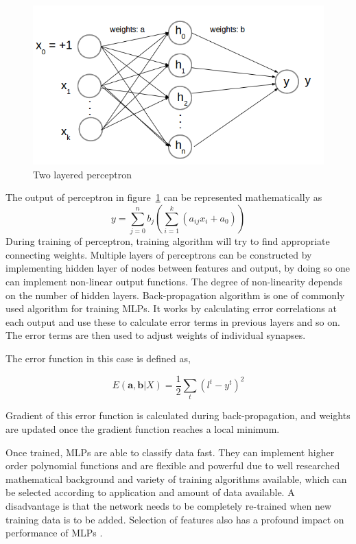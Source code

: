\begin{figure}[h]
  \begin{center}
    \captionsetup{justification=centering}
    \includegraphics[scale=0.45]{figures/perceptron.png}
    \caption{Two layered perceptron}
    \label{fig:perceptron}
  \end{center}
\end{figure}

The output of perceptron in figure~\ref{fig:perceptron} can be represented mathematically as
\[ y = \sum\limits_{j=0}^n b_j (\sum\limits_{i=1}^k (a_{ij}x_i + a_0))\]
During training of perceptron, training algorithm will try to find appropriate connecting weights. Multiple layers of perceptrons can be constructed by implementing hidden layer of nodes between features and output, by doing so one can implement non-linear output functions. The degree of non-linearity depends on the number of hidden layers. Back-propagation algorithm \cite{Rumelhart1985} is one of commonly used algorithm for training MLPs. It works by calculating error correlations at each output and use these to calculate error terms in previous layers and so on. The error terms are then used to adjust weights of individual synapses. 

The error function in this case is defined as,

\[ E(\boldsymbol{a},\boldsymbol{b}|X) = \frac{1}{2} \sum\limits_{t} (l^t - y^t)^2\]

Gradient of this error function is calculated during back-propagation, and weights are updated once the gradient function reaches a local minimum.

Once trained, MLPs are able to classify data fast. They can implement higher order polynomial functions and are flexible and powerful due to well researched mathematical background and variety of training algorithms available, which can be selected according to application and amount of data available. A disadvantage is that the network needs to be completely re-trained when new training data is to be added. Selection of features also has a profound impact on performance of MLPs \cite{Kavzoglu2002, El-Khatib2010}.

